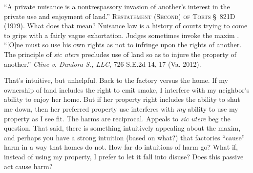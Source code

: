 ``A private nuisance is a nontrespassory invasion of another's interest in the
private use and enjoyment of land.'' \textsc{Restatement (Second) of Torts}
\S~821D (1979). What does that mean? Nuisance law is a history of courts trying
to come to grips with a fairly vague exhortation. Judges sometimes invoke the
maxim . ``[O]ne must so use
his own
rights as not to infringe upon the rights of another. The principle of
\textit{sic utere} precludes use of land so as to injure the property of
another.'' \emph{Cline v. Dunlora S., LLC}, 726 S.E.2d 14, 17 (Va. 2012). 

That's intuitive, but unhelpful. Back to the factory versus the home. If my
ownership of land includes the right to emit smoke, I interfere with my
neighbor's ability to enjoy her home. But if her property right includes the
ability to shut me down, then her preferred property use interferes with
\textit{my} ability to use my property as I see fit. The harms are reciprocal.
Appeals to \textit{sic utere} beg the question. That said, there is something
intuitively appealing about the maxim, and perhaps you have a strong intuition
(based on what?) that factories ``cause'' harm in a way that homes do not. How
far do intuitions of harm go? What if, instead of using my property, I prefer to
let it fall into disuse? Does this passive act cause harm? 

